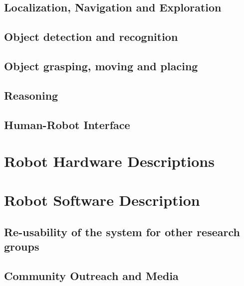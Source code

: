 \documentclass[runningheads,a4paper]{llncs}
\begin{document}
\subsection{Localization, Navigation and Exploration}


\subsection{Object detection and recognition}


\subsection{Object grasping, moving and placing}


\subsection{Reasoning}


\newpage
\subsection{Human-Robot Interface}


\section*{Robot Hardware Descriptions}


\section*{Robot Software Description}


\subsection{Re-usability of the system for other research groups}


\subsection{Community Outreach and Media}




\end{document}
